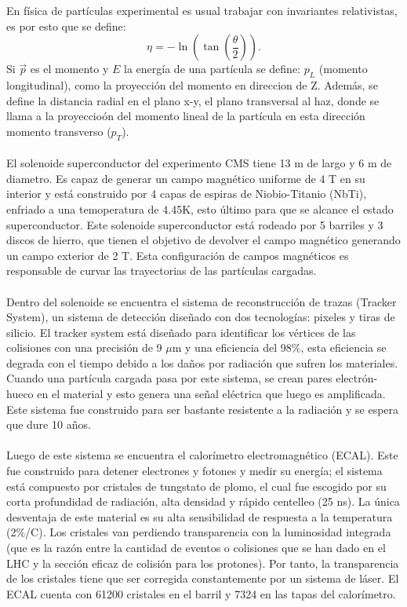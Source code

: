 En física de partículas experimental es usual trabajar con invariantes relativistas, es por esto que se define:
\begin{equation}
	\eta=-\ln\left(\tan\left(\frac{\theta}{2}\right) \right).
\end{equation} 	
Si $\vec{p}$ es el momento y $E$ la energía de una partícula se define: $p_L$ (momento longitudinal), como la proyección del momento en direccion de Z. Además, se define la distancia radial en el plano x-y, el plano transversal al haz, donde se llama a la proyeccioón del momento lineal de la partícula en esta dirección momento transverso ($p_T$).  
\\
\\
El solenoide superconductor del experimento CMS tiene 13 m de largo y 6 m de diametro. Es capaz de generar un campo magnético uniforme de 4 T en su interior y está construido por 4 capas de espiras de Niobio-Titanio (NbTi), enfriado a una temoperatura de 4.45K, esto último para que se alcance el estado superconductor. Este solenoide superconductor está rodeado por 5 barriles y 3 discos de hierro, que tienen el objetivo de devolver el campo magnético generando un campo exterior de 2 T.  Esta configuración de campos magnéticos es responsable de curvar las trayectorias de las partículas cargadas.
\\
\\
Dentro del solenoide se encuentra el sistema de reconstrucción de trazas (Tracker System), un sistema de detección diseñado con dos tecnologías: pixeles y tiras de silicio. El tracker system está diseñado para identificar los vértices de las colisiones con una precisión de 9 $\mu$m y una eficiencia del 98\%, esta eficiencia se degrada con el tiempo debido a los daños por radiación que sufren los materiales. Cuando una partícula cargada pasa por este sistema, se crean pares electrón-hueco en el material y esto genera una señal eléctrica que luego es amplificada. Este sistema fue construido para ser bastante resistente a la radiación y se espera que dure 10 años.
\\
\\
Luego de este sistema se encuentra el calorímetro electromagnético (ECAL). Este fue construido para detener electrones y fotones y medir su energía; el sistema está compuesto por cristales de tungstato de plomo, el cual fue escogido por su corta profundidad de radiación, alta densidad y rápido centelleo (25 ns). La única desventaja de este material es su alta sensibilidad de respuesta a la temperatura (2\%/C). Los cristales van perdiendo transparencia con la luminosidad integrada (que es la razón entre la cantidad de eventos o colisiones que se han dado en el LHC y la sección eficaz de colisión para los protones\cite{RuizAlvarez:2016mhn}). Por tanto, la transparencia de los cristales tiene que ser corregida constantemente por un sistema de láser. El ECAL cuenta con 61200 cristales en el barril y 7324 en las tapas del calorímetro.
